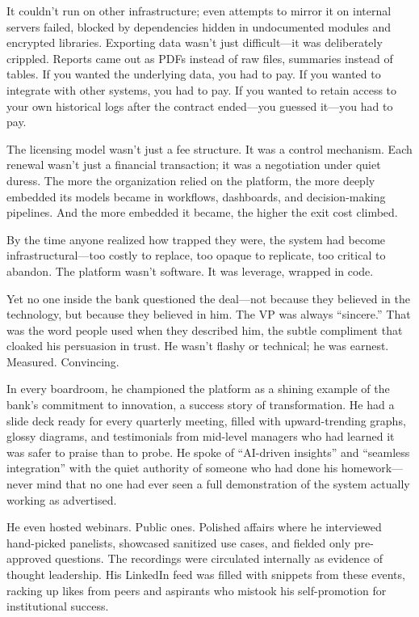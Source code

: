 It couldn’t run on other infrastructure; even attempts to mirror it on internal servers failed, blocked by dependencies hidden in undocumented modules and encrypted libraries. Exporting data wasn’t just difficult—it was deliberately crippled. Reports came out as PDFs instead of raw files, summaries instead of tables. If you wanted the underlying data, you had to pay. If you wanted to integrate with other systems, you had to pay. If you wanted to retain access to your own historical logs after the contract ended—you guessed it—you had to pay.

The licensing model wasn’t just a fee structure. It was a control mechanism. Each renewal wasn’t just a financial transaction; it was a negotiation under quiet duress. The more the organization relied on the platform, the more deeply embedded its models became in workflows, dashboards, and decision-making pipelines. And the more embedded it became, the higher the exit cost climbed.

By the time anyone realized how trapped they were, the system had become infrastructural—too costly to replace, too opaque to replicate, too critical to abandon. The platform wasn’t software. It was leverage, wrapped in code.

Yet no one inside the bank questioned the deal—not because they believed in the technology, but because they believed in him. The VP was always “sincere.” That was the word people used when they described him, the subtle compliment that cloaked his persuasion in trust. He wasn’t flashy or technical; he was earnest. Measured. Convincing.

In every boardroom, he championed the platform as a shining example of the bank’s commitment to innovation, a success story of transformation. He had a slide deck ready for every quarterly meeting, filled with upward-trending graphs, glossy diagrams, and testimonials from mid-level managers who had learned it was safer to praise than to probe. He spoke of “AI-driven insights” and “seamless integration” with the quiet authority of someone who had done his homework—never mind that no one had ever seen a full demonstration of the system actually working as advertised.

He even hosted webinars. Public ones. Polished affairs where he interviewed hand-picked panelists, showcased sanitized use cases, and fielded only pre-approved questions. The recordings were circulated internally as evidence of thought leadership. His LinkedIn feed was filled with snippets from these events, racking up likes from peers and aspirants who mistook his self-promotion for institutional success.

